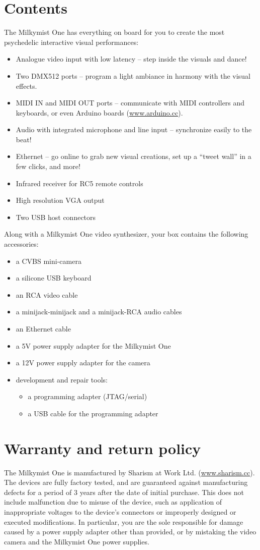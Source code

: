 \documentclass{leaflet}
\begin{document}
\section{Contents}
The Milkymist One has everything on board for you to create the most psychedelic interactive visual performances:
\begin{itemize}
\item Analogue video input with low latency -- step inside the visuals and dance!
\item Two DMX512 ports -- program a light ambiance in harmony with the visual effects.
\item MIDI IN and MIDI OUT ports -- communicate with MIDI controllers and keyboards, or even Arduino boards (\url{www.arduino.cc}).
\item Audio with integrated microphone and line input -- synchronize easily to the beat!
\item Ethernet -- go online to grab new visual creations, set up a ``tweet wall'' in a few clicks, and more!
\item Infrared receiver for RC5 remote controls
\item High resolution VGA output
\item Two USB host connectors
\end{itemize}

Along with a Milkymist One video synthesizer, your box contains the following accessories:
\begin{itemize}
\item a CVBS mini-camera
\item a silicone USB keyboard
\item an RCA video cable
\item a minijack-minijack and a minijack-RCA audio cables
\item an Ethernet cable
\item a 5V power supply adapter for the Milkymist One
\item a 12V power supply adapter for the camera
\item development and repair tools:
\begin{itemize}
\item a programming adapter (JTAG/serial)
\item a USB cable for the programming adapter
\end{itemize}
\end{itemize}

\section{Warranty and return policy}
The Milkymist One is manufactured by Sharism at Work Ltd. (\url{www.sharism.cc}). The devices are fully factory tested, and are guaranteed against manufacturing defects for a period of 3 years after the date of initial purchase. This does not include malfunction due to misuse of the device, such as application of inappropriate voltages to the device's connectors or improperly designed or executed modifications. In particular, you are the sole responsible for damage caused by a power supply adapter other than provided, or by mistaking the video camera and the Milkymist One power supplies.
\end{document}

